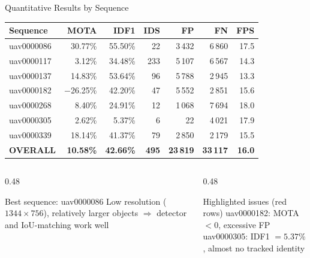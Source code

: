 \documentclass[aspectratio=169]{beamer}
\begin{document}
\begin{frame}{Quantitative Results by Sequence}
  \renewcommand{\arraystretch}{1.25}
  \small
  \begin{tabular}{lrrrrrr}
    \toprule
    \textbf{Sequence} & \textbf{MOTA}    & \textbf{IDF1}
                      & \textbf{IDS}     & \textbf{FP}      & \textbf{FN}      & \textbf{FPS}                  \\
    \midrule
    uav0000086        & 30.77\%          & 55.50\%          & 22               & 3\,432        & 6\,860 & 17.5 \\
    uav0000117        & 3.12\%           & 34.48\%          & 233              & 5\,107        & 6\,567 & 14.3 \\
    uav0000137        & 14.83\%          & 53.64\%          & 96               & 5\,788        & 2\,945 & 13.3 \\
    \rowcolor{red!10}
    uav0000182        & $-$26.25\%       & 42.20\%          & 47               & 5\,552        & 2\,851 & 15.6 \\
    uav0000268        & 8.40\%           & 24.91\%          & 12               & 1\,068        & 7\,694 & 18.0 \\
    \rowcolor{red!10}
    uav0000305        & 2.62\%           & 5.37\%           & 6                & 22            & 4\,021 & 17.9 \\
    uav0000339        & 18.14\%          & 41.37\%          & 79               & 2\,850        & 2\,179 & 15.5 \\
    \midrule
    \textbf{OVERALL}  & \textbf{10.58\%} & \textbf{42.66\%}
                      & \textbf{495}     & \textbf{23\,819} & \textbf{33\,117} & \textbf{16.0}                 \\
    \bottomrule
  \end{tabular}
  \vspace{0.4em}
  \begin{columns}[T]
    \begin{column}{0.48\textwidth}
      \begin{block}{Best sequence: uav0000086}
        \small Low resolution ($1344\!\times\!756$), relatively larger objects
        $\Rightarrow$ detector and IoU-matching work well
      \end{block}
    \end{column}
    \begin{column}{0.48\textwidth}
      \begin{alertblock}{Highlighted issues (red rows)}
        \small uav0000182: MOTA $<0$, excessive FP\\
        uav0000305: IDF1 $=5.37\%$, almost no tracked identity
      \end{alertblock}
    \end{column}
  \end{columns}
\end{frame}
\end{document}
